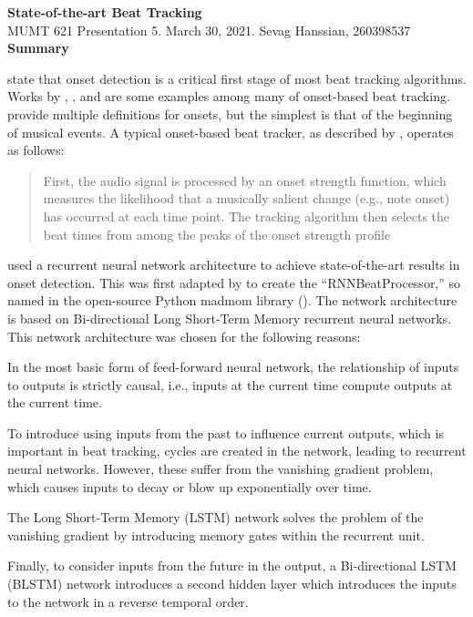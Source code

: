 \documentclass[letter,11pt]{report}
\newenvironment{tight_itemize}{
\begin{itemize}
  \setlength{\itemsep}{0pt}
  \setlength{\parskip}{0pt}
}{\end{itemize}}
\begin{document}
\noindent\LARGE{\textbf{State-of-the-art Beat Tracking}}\\
\Large{MUMT 621 Presentation 5. March 30, 2021. Sevag Hanssian, 260398537}\\

\noindent\Large{\textbf{Summary}}

\textcite{mcfee} state that onset detection is a critical first stage of most beat tracking algorithms. Works by \textcite{goto}, \textcite{ellis}, and \textcite{btrack} are some examples among many of onset-based beat tracking. \textcite{onsets} provide multiple definitions for onsets, but the simplest is that of the beginning of musical events. A typical onset-based beat tracker, as described by \textcite{mcfee}, operates as follows:
\begin{quote}
	\vspace{-0.25em}
	First, the audio signal is processed by an onset strength function, which measures the likelihood that a musically salient change (e.g., note onset) has occurred at each time point. The tracking algorithm then selects the beat times from among the peaks of the onset strength profile
\end{quote}

\textcite{rnnonset} used a recurrent neural network architecture to achieve state-of-the-art results in onset detection. This was first adapted by \textcite{bock1} to create the ``RNNBeatProcessor,'' so named in the open-source Python madmom library (\cite{madmom}). The network architecture is based on Bi-directional Long Short-Term Memory recurrent neural networks. This network architecture was chosen for the following reasons:

\begin{tight_itemize}
	\vspace{-0.25em}
	\item
		In the most basic form of feed-forward neural network, the relationship of inputs to outputs is strictly causal, i.e., inputs at the current time compute outputs at the current time.
	\item
		To introduce using inputs from the past to influence current outputs, which is important in beat tracking, cycles are created in the network, leading to recurrent neural networks. However, these suffer from the vanishing gradient problem, which causes inputs to decay or blow up exponentially over time.
	\item
		The Long Short-Term Memory (LSTM) network solves the problem of the vanishing gradient by introducing memory gates within the recurrent unit.
	\item
		Finally, to consider inputs from the future in the output, a Bi-directional LSTM (BLSTM) network introduces a second hidden layer which introduces the inputs to the network in a reverse temporal order.
\end{tight_itemize}
\end{document}
